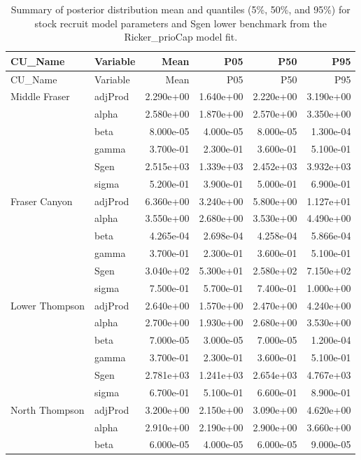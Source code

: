 \documentclass[11pt]{book}
\begin{document}
\begin{longtable}[]{@{}llrrrr@{}}
\caption{\label{tab:coho-postSummary-RickerCap}Summary of posterior distribution mean and quantiles (5\%, 50\%, and 95\%) for stock recruit model parameters and Sgen lower benchmark from the Ricker\_prioCap model fit.}\tabularnewline
\toprule
CU\_Name & Variable & Mean & P05 & P50 & P95 \\
\midrule
\endfirsthead
\toprule
CU\_Name & Variable & Mean & P05 & P50 & P95 \\
\midrule
\endhead
Middle Fraser & adjProd & 2.290e+00 & 1.640e+00 & 2.220e+00 & 3.190e+00 \\
& alpha & 2.580e+00 & 1.870e+00 & 2.570e+00 & 3.350e+00 \\
& beta & 8.000e-05 & 4.000e-05 & 8.000e-05 & 1.300e-04 \\
& gamma & 3.700e-01 & 2.300e-01 & 3.600e-01 & 5.100e-01 \\
& Sgen & 2.515e+03 & 1.339e+03 & 2.452e+03 & 3.932e+03 \\
& sigma & 5.200e-01 & 3.900e-01 & 5.000e-01 & 6.900e-01 \\
Fraser Canyon & adjProd & 6.360e+00 & 3.240e+00 & 5.800e+00 & 1.127e+01 \\
& alpha & 3.550e+00 & 2.680e+00 & 3.530e+00 & 4.490e+00 \\
& beta & 4.265e-04 & 2.698e-04 & 4.258e-04 & 5.866e-04 \\
& gamma & 3.700e-01 & 2.300e-01 & 3.600e-01 & 5.100e-01 \\
& Sgen & 3.040e+02 & 5.300e+01 & 2.580e+02 & 7.150e+02 \\
& sigma & 7.500e-01 & 5.700e-01 & 7.400e-01 & 1.000e+00 \\
Lower Thompson & adjProd & 2.640e+00 & 1.570e+00 & 2.470e+00 & 4.240e+00 \\
& alpha & 2.700e+00 & 1.930e+00 & 2.680e+00 & 3.530e+00 \\
& beta & 7.000e-05 & 3.000e-05 & 7.000e-05 & 1.200e-04 \\
& gamma & 3.700e-01 & 2.300e-01 & 3.600e-01 & 5.100e-01 \\
& Sgen & 2.781e+03 & 1.241e+03 & 2.654e+03 & 4.767e+03 \\
& sigma & 6.700e-01 & 5.100e-01 & 6.600e-01 & 8.900e-01 \\
North Thompson & adjProd & 3.200e+00 & 2.150e+00 & 3.090e+00 & 4.620e+00 \\
& alpha & 2.910e+00 & 2.190e+00 & 2.900e+00 & 3.660e+00 \\
& beta & 6.000e-05 & 4.000e-05 & 6.000e-05 & 9.000e-05 \\

\end{longtable}
\end{document}
